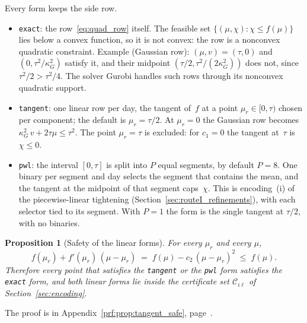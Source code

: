 \documentclass[11pt,a4paper]{article}
\theoremstyle{plain}
\newtheorem{proposition}[theorem]{Proposition}
\theoremstyle{definition}
\theoremstyle{remark}
\begin{document}
Every form keeps the side row.
\begin{itemize}
  \item \texttt{exact}: the row~\eqref{eq:quad_row} itself.
    The feasible set $\{(\mu, \chi) : \chi \le f(\mu)\}$ lies below a convex function, so it is not convex: the row is a nonconvex quadratic constraint.
    Example (Gaussian row): $(\mu, v) = (\tau, 0)$ and $(0, \tau^2/\kappa_G^2)$ satisfy it, and their midpoint $(\tau/2, \tau^2/(2\kappa_G^2))$ does not, since $\tau^2/2 > \tau^2/4$.
    The solver Gurobi handles such rows through its nonconvex quadratic support.
  \item \texttt{tangent}: one linear row per day, the tangent of~$f$ at a point $\mu_r \in [0, \tau)$ chosen per component; the default is $\mu_r = \tau/2$.
    At $\mu_r = 0$ the Gaussian row becomes $\kappa_G^2\, v + 2\tau\mu \le \tau^2$.
    The point $\mu_r = \tau$ is excluded: for $c_1 = 0$ the tangent at~$\tau$ is $\chi \le 0$.
  \item \texttt{pwl}: the interval $[0, \tau]$ is split into $P$ equal segments, by default $P = 8$.
    One binary per segment and day selects the segment that contains the mean, and the tangent at the midpoint of that segment caps~$\chi$.
    This is encoding~(i) of the piecewise-linear tightening (Section~\ref{sec:routeI_refinements}), with each selector tied to its segment.
    With $P = 1$ the form is the single tangent at $\tau/2$, with no binaries.
\end{itemize}

\begin{proposition}[Safety of the linear forms]\label{prop:tangent_safe}
For every $\mu_r$ and every $\mu$,
\begin{equation}
  f(\mu_r) + f'(\mu_r)\,(\mu - \mu_r) \;=\; f(\mu) - c_2\,(\mu - \mu_r)^2 \;\le\; f(\mu).
\end{equation}
Therefore every point that satisfies the \texttt{tangent} or the \texttt{pwl} form satisfies the \texttt{exact} form, and both linear forms lie inside the certificate set $\mathcal{C}_{i\ell}$ of Section~\ref{sec:encoding}.
\end{proposition}
The proof is in Appendix~\ref{prf:prop:tangent_safe}, page~\pageref{prf:prop:tangent_safe}.
\end{document}
